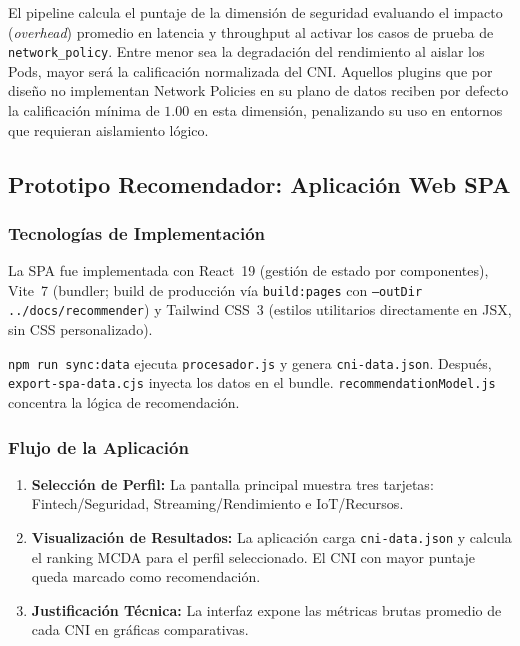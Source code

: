 El pipeline calcula el puntaje de la dimensión de seguridad evaluando el impacto (\emph{overhead}) promedio en latencia y throughput al activar los casos de prueba de \texttt{network\_policy}. Entre menor sea la degradación del rendimiento al aislar los Pods, mayor será la calificación normalizada del CNI. Aquellos plugins que por diseño no implementan Network Policies en su plano de datos reciben por defecto la calificación mínima de $1.00$ en esta dimensión, penalizando su uso en entornos que requieran aislamiento lógico.

\subsection{Prototipo Recomendador: Aplicación Web SPA}

\subsubsection{Tecnologías de Implementación}

La SPA fue implementada con React~19 (gestión de estado por componentes), Vite~7 (bundler; build de producción vía \texttt{build:pages} con \texttt{--outDir ../docs/recommender}) y Tailwind CSS~3 (estilos utilitarios directamente en JSX, sin CSS personalizado).

\texttt{npm run sync:data} ejecuta \texttt{procesador.js} y genera \texttt{cni-data.json}. Después, \texttt{export-spa-data.cjs} inyecta los datos en el bundle. \texttt{recommendationModel.js} concentra la lógica de recomendación.

\subsubsection{Flujo de la Aplicación}

\begin{enumerate}
\item \textbf{Selección de Perfil:} La pantalla principal muestra tres tarjetas: Fintech/Seguridad, Streaming/Rendimiento e IoT/Recursos.
\item \textbf{Visualización de Resultados:} La aplicación carga \texttt{cni-data.json} y calcula el ranking MCDA para el perfil seleccionado. El CNI con mayor puntaje queda marcado como recomendación.
\item \textbf{Justificación Técnica:} La interfaz expone las métricas brutas promedio de cada CNI en gráficas comparativas.
\end{enumerate}

